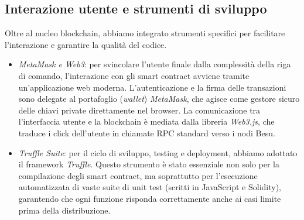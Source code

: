 \subsection{Interazione utente e strumenti di sviluppo}
Oltre al nucleo blockchain, abbiamo integrato strumenti specifici per facilitare l'interazione e garantire la qualità del codice.
\begin{itemize}
    \item \textit{MetaMask e Web3}: per svincolare l'utente finale dalla complessità della riga di comando, l'interazione con gli smart contract avviene tramite un'applicazione web moderna. L'autenticazione e la firma delle transazioni sono delegate al portafoglio (\textit{wallet}) \textit{MetaMask}, che agisce come gestore sicuro delle chiavi private direttamente nel browser. La comunicazione tra l'interfaccia utente e la blockchain è mediata dalla libreria \textit{Web3.js}, che traduce i click dell'utente in chiamate RPC standard verso i nodi Besu.
    \item \textit{Truffle Suite}: per il ciclo di sviluppo, testing e deployment, abbiamo adottato il framework \textit{Truffle}. Questo strumento è stato essenziale non solo per la compilazione degli smart contract, ma soprattutto per l'esecuzione automatizzata di vaste suite di unit test (scritti in JavaScript e Solidity), garantendo che ogni funzione risponda correttamente anche ai casi limite prima della distribuzione.
\end{itemize}

